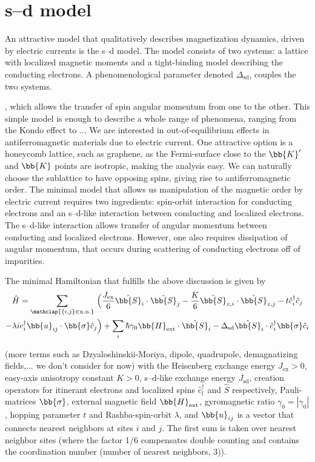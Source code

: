 \section{s--d model}
An attractive model that qualitatively describes magnetization dynamics, driven by electric currents is the s--d model. The model consists of two systems: a lattice with localized magnetic moments and a tight-binding model describing the conducting electrons. A phenomenological parameter denoted $\Delta_\text{sd}$, couples the two systems. 

, which allows the transfer of spin angular momentum from one to the other. This simple model is enough to describe a whole range of phenomena, ranging from the Kondo effect to ... 
We are interested in out-of-equilibrium effects in antiferromagnetic materials due to electric current. One attractive option is a honeycomb lattice, such as graphene, as the Fermi-surface close to the $\bb{K}'$ and $\bb{K}$ points are isotropic, making the analysis easy. We can naturally choose the sublattice to have opposing spins, giving rise to antiferromagnetic order. The minimal model that allows us manipulation of the magnetic order by electric current requires two ingredients: spin-orbit interaction for conducting electrons and an s--d-like interaction between conducting and localized electrons. The s--d-like interaction allows transfer of angular momentum between conducting and localized electrons. However, one also requires dissipation of angular momentum, that occurs during scattering of conducting electrons off of impurities. 

The minimal Hamiltonian that fulfills the above discussion is given by 
\begin{multline}
    \hat{H}
        = \sum_{\mathclap{\{i,j\}\in\text{n.n.}}}\,\Big(\frac{J_{\text{ex}}}{6}\hat{\bb{S}}_i\cdot\hat{\bb{S}}_j - \frac{K}{6}\hat{\bb{S}}_{z,i}\cdot\hat{\bb{S}}_{z,j}-t \hat{c}_i^\dagger\hat{c}_j\\
        -\lambda i c_i^\dagger \bb{u}_{ij}\cdot\bb{\sigma}\hat{c}_j\Big)+\sum_i \hslash\gamma_0\bb{H}_\text{ext}\cdot\hat{\bb{S}}_i-\Delta_\text{sd}\hat{\bb{S}}_i\cdot\hat{c}_i^\dagger\bb{\sigma}\hat{c}_i
    \label{intro:eq:Hm}
\end{multline}

(more terms such as Dzyaloshinskii-Moriya, dipole, quadrupole, demagnatizing fields,... we don't consider for now) with the Heisenberg exchange energy $J_{\text{ex}}>0$, easy-axis anisotropy constant $K>0$, s--d-like exchange energy $J_{\text{sd}}$, creation operators for itinerant electrons and localized spins $\hat{c}^\dagger_l$ and $\hat{S}$ respectively, Pauli-matrices $\bb{\sigma}$, external magnetic field $\bb{H}_\text{ext}$, gyromagnetic ratio $\gamma_0=|\gamma_0|$, hopping parameter $t$ and Rashba-spin-orbit $\lambda$, and $\bb{u}_{ij}$ is a vector that connects nearest neighbors at sites $i$ and $j$.  The first sum is taken over nearest neighbor sites (where the factor 1/6 compensates double counting and contains the coordination number (number of nearest neighbors, 3)). 

